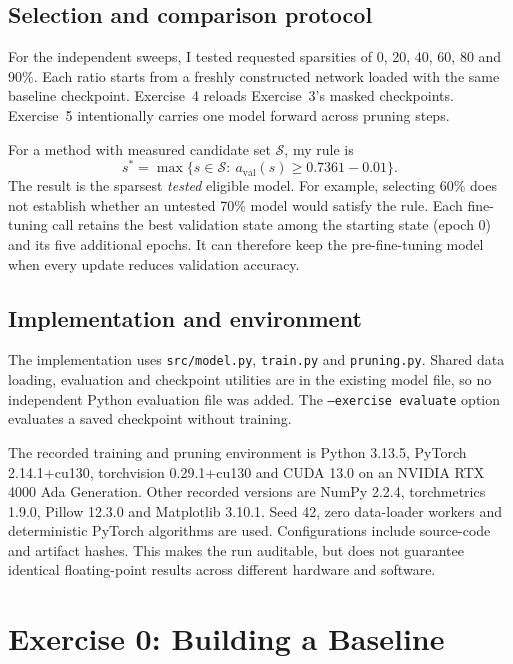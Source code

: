 \documentclass[11pt,a4paper]{article}
\newcommand{\code}[1]{\texttt{#1}}
\begin{document}
\subsection{Selection and comparison protocol}

For the independent sweeps, I tested requested sparsities of 0, 20, 40, 60, 80 and 90\%. Each ratio starts from a freshly constructed network loaded with the same baseline checkpoint. Exercise~4 reloads Exercise~3's masked checkpoints. Exercise~5 intentionally carries one model forward across pruning steps.

For a method with measured candidate set $\mathcal S$, my rule is
\begin{equation}
 s^*=\max\{s\in\mathcal S:\ a_{\mathrm{val}}(s)\geq0.7361-0.01\}.
\end{equation}
The result is the sparsest \emph{tested} eligible model. For example, selecting 60\% does not establish whether an untested 70\% model would satisfy the rule. Each fine-tuning call retains the best validation state among the starting state (epoch 0) and its five additional epochs. It can therefore keep the pre-fine-tuning model when every update reduces validation accuracy.

\subsection{Implementation and environment}

The implementation uses \code{src/model.py}, \code{train.py} and \code{pruning.py}. Shared data loading, evaluation and checkpoint utilities are in the existing model file, so no independent Python evaluation file was added. The \code{--exercise evaluate} option evaluates a saved checkpoint without training.

The recorded training and pruning environment is Python 3.13.5, PyTorch 2.14.1+cu130, torchvision 0.29.1+cu130 and CUDA 13.0 on an NVIDIA RTX 4000 Ada Generation. Other recorded versions are NumPy 2.2.4, torchmetrics 1.9.0, Pillow 12.3.0 and Matplotlib 3.10.1. Seed 42, zero data-loader workers and deterministic PyTorch algorithms are used. Configurations include source-code and artifact hashes. This makes the run auditable, but does not guarantee identical floating-point results across different hardware and software.

\section{Exercise 0: Building a Baseline}
\end{document}
